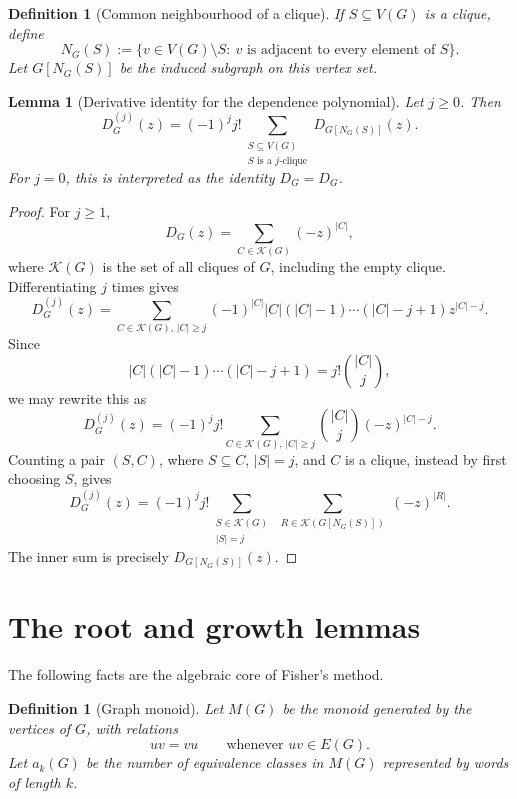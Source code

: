 \documentclass[11pt]{article}
\newtheorem{lemma}[theorem]{Lemma}
\newtheorem{definition}[theorem]{Definition}
\newcommand{\K}{\mathcal{K}}
\newcommand{\V}{V}
\newcommand{\E}{E}
\begin{document}
\begin{definition}[Common neighbourhood of a clique]
If \(S\subseteq \V(G)\) is a clique, define
\[
        N_G(S)
        :=
        \{v\in \V(G)\setminus S:\ v\text{ is adjacent to every element of }S\}.
\]
Let \(G[N_G(S)]\) be the induced subgraph on this vertex set.
\end{definition}

\begin{lemma}[Derivative identity for the dependence polynomial]
\label{lem:derivative-identity}
Let \(j\ge 0\).  Then
\[
        D_G^{(j)}(z)
        =
        (-1)^j j!
        \sum_{\substack{S\subseteq \V(G)\\ S\text{ is a }j\text{-clique}}}
        D_{G[N_G(S)]}(z).
\]
For \(j=0\), this is interpreted as the identity \(D_G=D_G\).
\end{lemma}

\begin{proof}
For \(j\ge 1\),
\[
        D_G(z)=\sum_{C\in \K(G)}(-z)^{|C|},
\]
where \(\K(G)\) is the set of all cliques of \(G\), including the empty clique.
Differentiating \(j\) times gives
\[
        D_G^{(j)}(z)
        =
        \sum_{C\in \K(G),\, |C|\ge j}
        (-1)^{|C|}
        |C|(|C|-1)\cdots(|C|-j+1)
        z^{|C|-j}.
\]
Since
\[
        |C|(|C|-1)\cdots(|C|-j+1)
        =
        j!\binom{|C|}{j},
\]
we may rewrite this as
\[
        D_G^{(j)}(z)
        =
        (-1)^j j!
        \sum_{C\in \K(G),\, |C|\ge j}
        \binom{|C|}{j}
        (-z)^{|C|-j}.
\]
Counting a pair \((S,C)\), where \(S\subseteq C\), \(|S|=j\), and \(C\) is a clique,
instead by first choosing \(S\), gives
\[
        D_G^{(j)}(z)
        =
        (-1)^j j!
        \sum_{\substack{S\in \K(G)\\ |S|=j}}
        \sum_{\substack{R\in \K(G[N_G(S)])}}
        (-z)^{|R|}.
\]
The inner sum is precisely \(D_{G[N_G(S)]}(z)\).
\end{proof}

\section{The root and growth lemmas}

The following facts are the algebraic core of Fisher's method.

\begin{definition}[Graph monoid]
Let \(M(G)\) be the monoid generated by the vertices of \(G\), with relations
\[
        uv=vu
        \qquad\text{whenever } uv\in \E(G).
\]
Let \(a_k(G)\) be the number of equivalence classes in \(M(G)\) represented by
words of length \(k\).
\end{definition}
\end{document}
